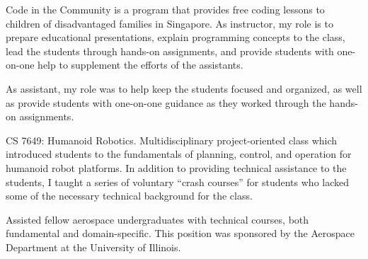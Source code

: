 
Code in the Community is a program that provides free coding lessons to children of disadvantaged families in Singapore. As instructor, my role is to prepare educational presentations, explain programming concepts to the class, lead the students through hands-on assignments, and provide students with one-on-one help to supplement the efforts of the assistants.

\divider

As assistant, my role was to help keep the students focused and organized, as well as provide students with one-on-one guidance as they worked through the hands-on assignments.

\divider

CS 7649: Humanoid Robotics. Multidisciplinary project-oriented class which introduced students to the fundamentals of planning, control, and operation for humanoid robot platforms. In addition to providing technical assistance to the students, I taught a series of voluntary ``crash courses'' for students who lacked some of the necessary technical background for the class.

\divider

Assisted fellow aerospace undergraduates with technical courses, both fundamental and domain-specific. This position was sponsored by the Aerospace Department at the University of Illinois.